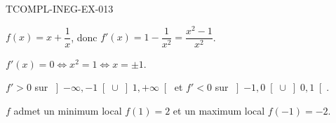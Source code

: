 \begin{corrige}{TCOMPL-INEG-EX-013}

$f(x) = x + \dfrac{1}{x}$, donc $f'(x) = 1 - \dfrac{1}{x^2} = \dfrac{x^2-1}{x^2}$.


$f'(x) = 0 \iff x^2 = 1 \iff x = \pm 1$.

$f' > 0$ sur $\left]-\infty, -1\right[ \cup \left]1, +\infty\right[$ et $f' < 0$ sur $\left]-1, 0\right[ \cup \left]0, 1\right[$.

$f$ admet un minimum local $f(1) = 2$ et un maximum local $f(-1) = -2$.

\end{corrige}
